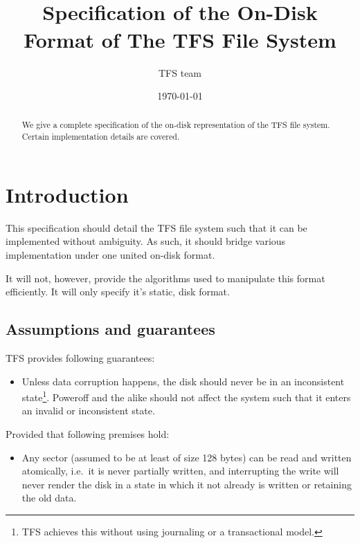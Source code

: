 \documentclass[11pt,a4paper]{report}
\title{
    \centering{}\\
    Specification of the On-Disk Format of The TFS File System
}
\author{TFS team}
\date{\today}
\newcommand{\minimumsectorsize}{128 }
\begin{document}
    \begin{abstract}
        We give a complete specification of the on-disk representation of the
        TFS file system. Certain implementation details are covered.
    \end{abstract}

    \maketitle
    \tableofcontents

    \chapter{Introduction}
    This specification should detail the TFS file system such that it can be
    implemented without ambiguity. As such, it should bridge various
    implementation under one united on-disk format.

    It will not, however, provide the algorithms used to manipulate this format
    efficiently. It will only specify it's static, disk format.

    \section{Assumptions and guarantees}
    \label{assumptions_guarantees}
        TFS provides following guarantees:

        \begin{itemize}
            \item Unless data corruption happens, the disk should never be in
                an inconsistent state\footnote{TFS achieves this without using
                journaling or a transactional model.}. Poweroff and the alike
                should not affect the system such that it enters an invalid or
                inconsistent state.
        \end{itemize}

        Provided that following premises hold:

        \begin{itemize}
            \item Any sector (assumed to be at least of size \minimumsectorsize
                bytes) can be read and written atomically, i.e.\ it is never
                partially written, and interrupting the write will never render
                the disk in a state in which it not already is written or
                retaining the old data.
        \end{itemize}
\end{document}
